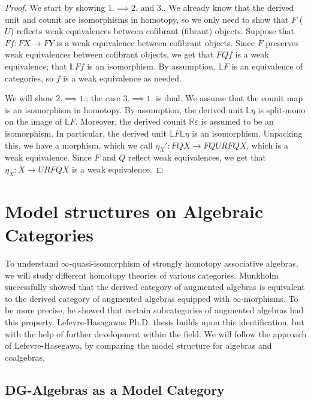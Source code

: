 \documentclass[../thesis.tex]{subfiles}
\begin{document}
            \begin{proof}
                We start by showing $1. \implies 2.$ and $3.$. We already know that the derived unit and counit are isomorphisms in homotopy, so we only need to show that $F$ ($U$) reflects weak equivalences between cofibrant (fibrant) objects. Suppose that $Ff: FX\rightarrow FY$ is a weak equivalence between cofibrant objects. Since $F$ preserves weak equivalences between cofibrant objects, we get that $FQf$ is a weak equivalence; that $\mathbb{L}Ff$ is an isomorphism. By assumption, $\mathbb{L}F$ is an equivalence of categories, so $f$ is a weak equivalence as needed.

                We will show $2.\implies 1.$; the case $3.\implies 1.$ is dual. We assume that the counit map is an isomorphism in homotopy. By assumption, the derived unit $\mathbb{L}\eta$ is split-mono on the image of $\mathbb{L}F$. Moreover, the derived counit $\mathbb{R}\varepsilon$ is assumed to be an isomorphism. In particular, the derived unit $\mathbb{L}F\mathbb{L}\eta$ is an isomorphism. Unpacking this, we have a morphism, which we call $\eta_X': FQX \rightarrow FQURFQX$, which is a weak equivalence. Since $F$ and $Q$ reflect weak equivalences, we get that $\eta_X: X \rightarrow URFQX$ is a weak equivalence.
            \end{proof}

    \section{Model structures on Algebraic Categories}

            To understand $\infty$-quasi-isomorphism of strongly homotopy associative algebras, we will study different homotopy theories of various categories. Munkholm \cite{Munkholm78} successfully showed that the derived category of augmented algebras is equivalent to the derived category of augmented algebras equipped with $\infty$-morphisms. To be more precise, he showed that certain subcategories of augmented algebras had this property. Lefevre-Hasagawas Ph.D. thesis \cite{LefevreHasegawa03} builds upon this identification, but with the help of further development within the field. We will follow the approach of Lefevre-Hasegawa, by comparing the model structure for algebras and coalgebras,

        \subsection{DG-Algebras as a Model Category}
\end{document}
